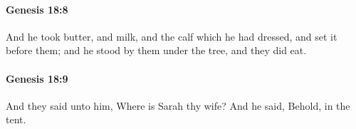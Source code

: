 		\paragraph{Genesis 18:8} %
			\label{GENESIS-18-8}

			And he took butter, and milk, and the calf which he had dressed, and set it before them; and he stood by them under the tree, and they did eat.


		\paragraph{Genesis 18:9} %
			\label{GENESIS-18-9}

			And they said unto him, Where is Sarah thy wife? And he said, Behold, in the tent.


